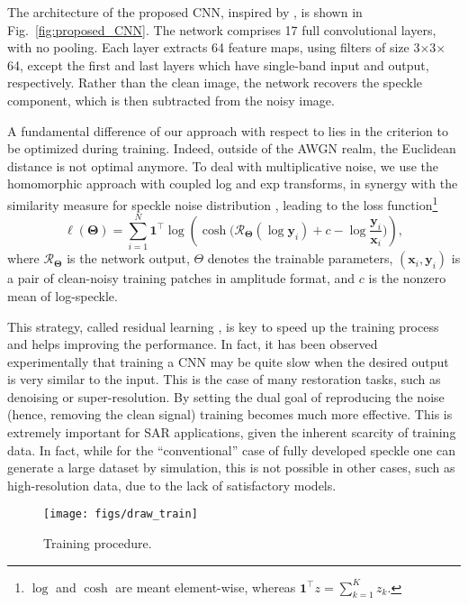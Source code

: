 \documentclass{article}
\begin{document}
The architecture of the proposed CNN, inspired by \cite{Zhang2016}, is shown in Fig.~\ref{fig:proposed_CNN}. The network comprises 17 full convolutional layers, with no pooling.
Each layer extracts 64 feature maps, using filters of size 3$\times$3$\times$64, except the first and last layers which have single-band input and output, respectively. Rather than the clean image, the network recovers the speckle component, which is then subtracted from the noisy image.

A fundamental difference of our approach with respect to \cite{Zhang2016} lies in the criterion to be optimized during training. Indeed, outside of the AWGN realm, the Euclidean distance is not optimal anymore. To deal with multiplicative noise, we use the homomorphic approach with coupled log and exp transforms, in synergy with the similarity measure for speckle noise distribution \cite{Deledalle2012}, leading to the loss function\footnote{$\log$ and $\cosh$ are meant element-wise, whereas $\mathbf{1}^\top z = \sum_{k=1}^K z_k$.}
\begin{equation}
\ell(\mathbf{\Theta}) = \sum_{i=1}^N \mathbf{1}^\top\log\left( \cosh\Big( \mathcal{R}_{\mathbf{\Theta}}(\log \mathbf{y}_i) +c - \log \frac{\mathbf{y}_i}{\mathbf{x}_i} \Big) \right),
\end{equation}
where $\mathcal{R}_{\mathbf{\Theta}}$ is the network output, $\Theta$ denotes the trainable parameters, $(\mathbf{x}_i,\mathbf{y}_i)$ is a pair of clean-noisy training patches in amplitude format, and $c$ is the nonzero mean of log-speckle.

This strategy, called residual learning \cite{He2016}, is key to speed up the training process and helps improving the performance.
In fact, it has been observed experimentally \cite{He2016} that training a CNN may be quite slow when the desired output is very similar to the input.
This is the case of many restoration tasks, such as denoising or super-resolution.
By setting the dual goal of reproducing the noise (hence, removing the clean signal)
training becomes much more effective.
This is extremely important for SAR applications, given the inherent scarcity of training data.
In fact, while for the ``conventional'' case of fully developed speckle one can generate a large dataset by simulation,
this is not possible in other cases, such as high-resolution data, due to the lack of satisfactory models.

\begin{figure*}[!t]
	\centerline{\texttt{[image: figs/draw\_train]}}
	\caption{Training procedure.}
	\label{fig:proposed_training}
\end{figure*}
\end{document}
